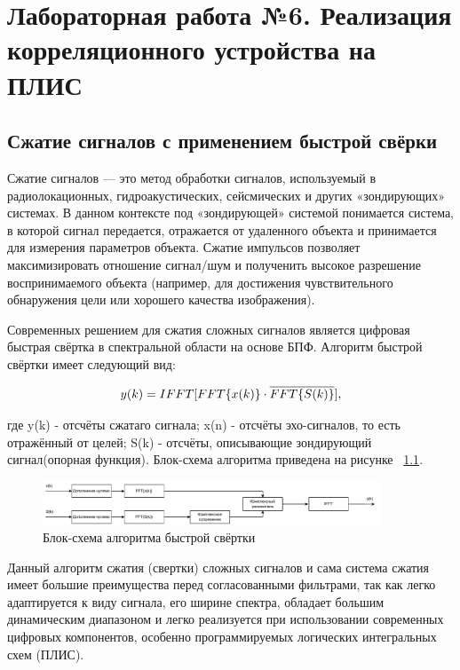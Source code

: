 \chapter{Лабораторная работа №6. Реализация корреляционного устройства на ПЛИС}

\section{Сжатие сигналов с применением быстрой свёрки}

Сжатие сигналов — это метод обработки сигналов, используемый в радиолокационных, гидроакустических, сейсмических и других «зондирующих» системах. В данном контексте под «зондирующей» системой понимается система, в которой сигнал передается, отражается от удаленного объекта и принимается для измерения параметров объекта. Сжатие импульсов позволяет максимизировать отношение сигнал/шум и полученить высокое разрешение воспринимаемого объекта (например, для достижения чувствительного обнаружения цели или хорошего качества изображения). 

Современных решением для сжатия сложных сигналов является цифровая быстрая свёртка в спектральной области на основе БПФ. Алгоритм быстрой свёртки имеет следующий вид:

\begin{equation}	
	y(k) = IFFT[FFT\{x(k)\} \cdot \overline{FFT\{S(k)\}}],
\end{equation}

где y(k) - отсчёты сжатаго сигнала; x(n) - отсчёты эхо-сигналов, то есть отражённый от целей;
S(k) - отсчёты, описывающие зондирующий сигнал(опорная функция). Блок-схема алгоритма приведена на рисунке ~\ref{fft_conv}.

\begin{figure}[h]
	\centering
	\includegraphics[width=0.9\textwidth]{fft_conv.pdf}
	\caption{Блок-схема алгоритма быстрой свёртки}
	\label{fft_conv}
\end{figure}

Данный алгоритм сжатия (свертки) сложных сигналов и сама система сжатия имеет большие преимущества перед согласованными фильтрами, так как легко адаптируется к виду сигнала, его ширине спектра, обладает большим динамическим диапазоном и легко реализуется при использовании современных цифровых компонентов, особенно программируемых логических интегральных схем (ПЛИС).

